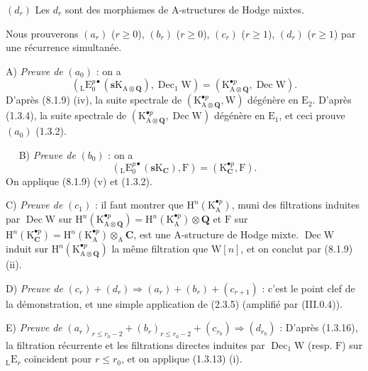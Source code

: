 \documentclass[11pt,leqno]{article}
\newcommand{\Page}[1]{\ifvmode\noindent\else\unskip\ \fi{\footnotesize\textcolor{gray}{[p.\,#1]}}\ \ignorespaces}
\begin{document}
\((d_{r})\) Les \(d_{r}\) sont des morphismes de \(\mathrm{A}\)-structures de Hodge mixtes.

Nous prouverons \((a_{r})\) (\(r\geq0\)), \((b_{r})\) (\(r\geq0\)), \((c_{r})\) (\(r\geq1\)), \((d_{r})\) (\(r\geq1\)) par une récurrence simultanée.

A) \textit{Preuve de} \((a_{0})\) : on a
\[
({}_{\mathrm{L}}\mathrm{E}_{0}^{p\bullet}
(\mathbf{s}\mathrm{K}_{\mathrm{A}\otimes\mathbf{Q}}),
\operatorname{Dec}_{1}\mathrm{W})
=
(\mathrm{K}_{\mathrm{A}\otimes\mathbf{Q}}^{\bullet p},
\operatorname{Dec}\mathrm{W}).
\]
D’après (8.1.9) (iv), la suite spectrale de \((\mathrm{K}_{\mathrm{A}\otimes\mathbf{Q}}^{\bullet p},\mathrm{W})\) dégénère en \(\mathrm{E}_{2}\). D’après (1.3.4), la suite spectrale de \((\mathrm{K}_{\mathrm{A}\otimes\mathbf{Q}}^{\bullet p},\operatorname{Dec}\mathrm{W})\) dégénère en \(\mathrm{E}_{1}\), et ceci prouve \((a_{0})\) (1.3.2).

\Page{34}
B) \textit{Preuve de} \((b_{0})\) : on a
\[
({}_{\mathrm{L}}\mathrm{E}_{0}^{p\bullet}
(\mathbf{s}\mathrm{K}_{\mathbf{C}}),\mathrm{F})
=
(\mathrm{K}_{\mathbf{C}}^{\bullet p},\mathrm{F}).
\]
On applique (8.1.9) (v) et (1.3.2).

C) \textit{Preuve de} \((c_{1})\) : il faut montrer que \(\mathrm{H}^{n}(\mathrm{K}_{\mathrm{A}}^{\bullet p})\), muni des filtrations induites par \(\operatorname{Dec}\mathrm{W}\) sur \(\mathrm{H}^{n}(\mathrm{K}_{\mathrm{A}\otimes\mathbf{Q}}^{\bullet p})=\mathrm{H}^{n}(\mathrm{K}_{\mathrm{A}}^{\bullet p})\otimes\mathbf{Q}\) et \(\mathrm{F}\) sur \(\mathrm{H}^{n}(\mathrm{K}_{\mathbf{C}}^{\bullet p})=\mathrm{H}^{n}(\mathrm{K}_{\mathrm{A}}^{\bullet p})\otimes_{\mathrm{A}}\mathbf{C}\), est une \(\mathrm{A}\)-structure de Hodge mixte. \(\operatorname{Dec}\mathrm{W}\) induit sur \(\mathrm{H}^{n}(\mathrm{K}_{\mathrm{A}\otimes\mathbf{Q}}^{\bullet p})\) la même filtration que \(\mathrm{W}[n]\), et on conclut par (8.1.9) (ii).

D) \textit{Preuve de} \((c_{r})+(d_{r})\Rightarrow(a_{r})+(b_{r})+(c_{r+1})\) : c’est le point clef de la démonstration, et une simple application de (2.3.5) (amplifié par (III.0.4)).

E) \textit{Preuve de} \((a_{r})_{r\leq r_{0}-2}+(b_{r})_{r\leq r_{0}-2}+(c_{r_{0}})\Rightarrow(d_{r_{0}})\) : D’après (1.3.16), la filtration récurrente et les filtrations directes induites par \(\operatorname{Dec}_{1}\mathrm{W}\) (resp. \(\mathrm{F}\)) sur \({}_{\mathrm{L}}\mathrm{E}_{r}\) coïncident pour \(r\leq r_{0}\), et on applique (1.3.13) (i).
\end{document}
